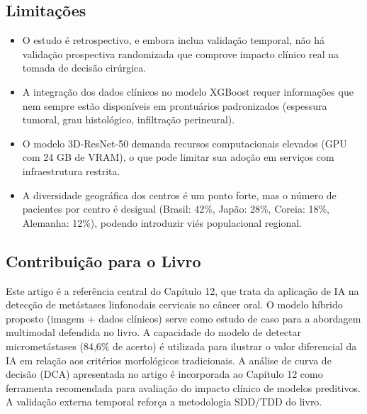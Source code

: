 \subsection{Limitações}
\begin{itemize}
  \item O estudo é retrospectivo, e embora inclua validação temporal,
        não há validação prospectiva randomizada que comprove impacto
        clínico real na tomada de decisão cirúrgica.
  \item A integração dos dados clínicos no modelo XGBoost requer
        informações que nem sempre estão disponíveis em prontuários
        padronizados (espessura tumoral, grau histológico, infiltração
        perineural).
  \item O modelo 3D-ResNet-50 demanda recursos computacionais elevados
        (GPU com 24 GB de VRAM), o que pode limitar sua adoção em
        serviços com infraestrutura restrita.
  \item A diversidade geográfica dos centros é um ponto forte, mas o
        número de pacientes por centro é desigual (Brasil: 42\%,
        Japão: 28\%, Coreia: 18\%, Alemanha: 12\%), podendo introduzir
        viés populacional regional.
\end{itemize}

\subsection{Contribuição para o Livro}
Este artigo é a referência central do Capítulo 12, que trata da aplicação
de IA na detecção de metástases linfonodais cervicais no câncer oral. O
modelo híbrido proposto (imagem + dados clínicos) serve como estudo de
caso para a abordagem multimodal defendida no livro. A capacidade do
modelo de detectar micrometástases (84,6\% de acerto) é utilizada para
ilustrar o valor diferencial da IA em relação aos critérios morfológicos
tradicionais. A análise de curva de decisão (DCA) apresentada no artigo
é incorporada ao Capítulo 12 como ferramenta recomendada para avaliação
do impacto clínico de modelos preditivos. A validação externa temporal
reforça a metodologia SDD/TDD do livro.

